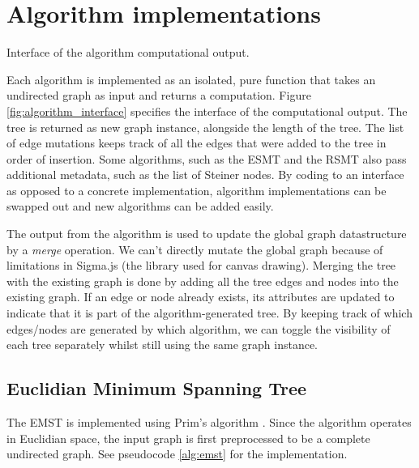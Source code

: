 \documentclass{l4proj}
\begin{document}
\section{Algorithm implementations}

\begin{wrapstuff}[r,width=0.3\textwidth,type=figure]
    \centering
    \caption{Interface of the algorithm computational output.}
    
    \label{fig:algorithm_interface}
\end{wrapstuff}
Each algorithm is implemented as an isolated, pure function that takes an undirected graph as input and returns a computation.
Figure \ref{fig:algorithm_interface} specifies the interface of the computational output. The tree is returned as new graph instance, alongside the length of the tree. The list of edge mutations keeps track of all the edges that were added to the tree in order of insertion. Some algorithms, such as the ESMT and the RSMT also pass additional metadata, such as the list of Steiner nodes.
By coding to an interface as opposed to a concrete implementation, algorithm implementations can be swapped out and new algorithms can be added easily.

The output from the algorithm is used to update the global graph datastructure by a \textit{merge} operation. We can't directly mutate the global graph because of limitations in Sigma.js (the library used for canvas drawing).
Merging the tree with the existing graph is done by adding all the tree edges and nodes into the existing graph. If an edge or node already exists, its attributes are updated to indicate that it is part of the algorithm-generated tree. By keeping track of which edges/nodes are generated by which algorithm, we can toggle the visibility of each tree separately whilst still using the same graph instance.

\wrapstuffclear
\subsection{Euclidian Minimum Spanning Tree}
The EMST is implemented using Prim's algorithm \citep[pp. 194--195]{Skiena2008}. Since the algorithm operates in Euclidian space, the input graph is first preprocessed to be a complete undirected graph. See pseudocode \ref{alg:emst} for the implementation.
\end{document}
